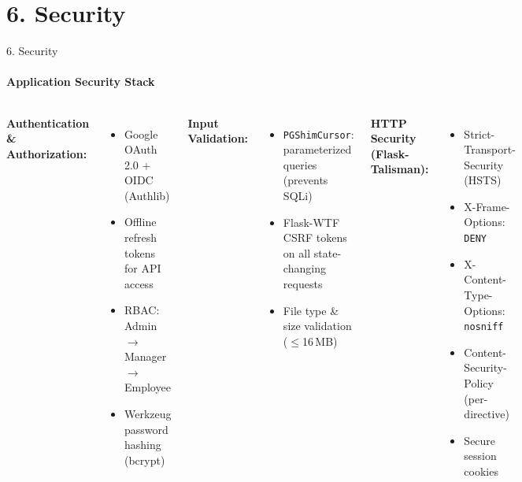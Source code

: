 \documentclass[10pt,aspectratio=169]{beamer}
\begin{document}
\section{6. Security}

\begin{frame}{6. Security}
    \framesubtitle{Application Security Stack}

    \begin{columns}
        \textbf{Authentication \& Authorization:}
        \begin{itemize}
            \item Google OAuth 2.0 + OIDC (Authlib)
            \item Offline refresh tokens for API access
            \item RBAC: Admin $\to$ Manager $\to$ Employee
            \item Werkzeug password hashing (bcrypt)
        \end{itemize}

        \vspace{0.3cm}
        \textbf{Input Validation:}
        \begin{itemize}
            \item \texttt{PGShimCursor}: parameterized queries (prevents SQLi)
            \item Flask-WTF CSRF tokens on all state-changing requests
            \item File type \& size validation ($\leq$16\,MB)
        \end{itemize}

        \textbf{HTTP Security (Flask-Talisman):}
        \begin{itemize}
            \item Strict-Transport-Security (HSTS)
            \item X-Frame-Options: \texttt{DENY}
            \item X-Content-Type-Options: \texttt{nosniff}
            \item Content-Security-Policy (per-directive)
            \item Secure session cookies
        \end{itemize}


\end{columns}
\end{frame}
\end{document}
